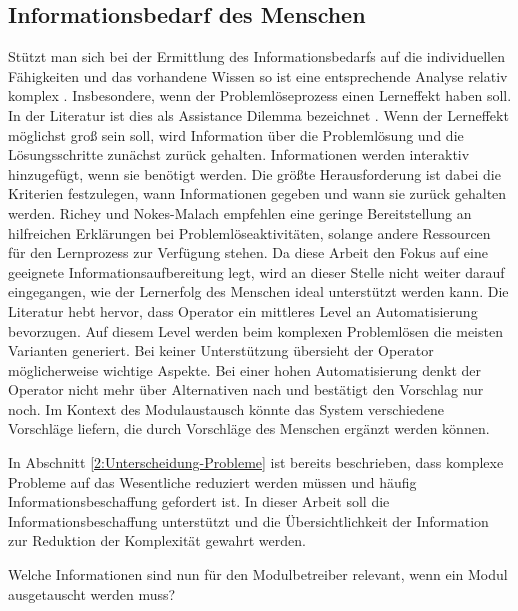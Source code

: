 \subsection{Informationsbedarf des Menschen}
\label{3:Informationsbedarf-Operator}
Stützt man sich bei der Ermittlung des Informationsbedarfs auf die individuellen Fähigkeiten und das vorhandene Wissen so ist eine entsprechende Analyse relativ komplex . Insbesondere, wenn der Problemlöseprozess einen Lerneffekt haben soll. In der Literatur ist dies als Assistance Dilemma bezeichnet \cite{Koedinger2007}. Wenn der Lerneffekt möglichst groß sein soll, wird Information über die Problemlösung und die Lösungsschritte zunächst zurück gehalten. Informationen werden interaktiv hinzugefügt, wenn sie benötigt werden. Die größte Herausforderung ist dabei die Kriterien festzulegen, wann Informationen gegeben und wann sie zurück gehalten werden\cite{Koedinger2007}.  Richey und Nokes-Malach \cite{Richey2013} empfehlen eine geringe Bereitstellung an hilfreichen Erklärungen bei Problemlöseaktivitäten, solange andere Ressourcen für den Lernprozess zur Verfügung stehen. Da diese Arbeit den Fokus auf eine geeignete Informationsaufbereitung legt, wird an dieser Stelle nicht weiter darauf eingegangen, wie der Lernerfolg des Menschen ideal unterstützt werden kann. Die Literatur \cite{Miller2005, Sauer2018} hebt hervor, dass Operator ein mittleres Level an Automatisierung bevorzugen. Auf diesem Level werden beim komplexen Problemlösen die meisten Varianten generiert. Bei keiner Unterstützung übersieht der Operator möglicherweise wichtige Aspekte. Bei einer hohen Automatisierung denkt der Operator nicht mehr über Alternativen nach und bestätigt den Vorschlag nur noch. \cite{Miller2005} Im Kontext des Modulaustausch könnte das System verschiedene Vorschläge liefern, die durch Vorschläge des Menschen ergänzt werden können.

In Abschnitt \ref{2:Unterscheidung-Probleme} ist bereits beschrieben, dass komplexe Probleme auf das Wesentliche reduziert werden müssen und häufig Informationsbeschaffung gefordert ist. In dieser Arbeit soll die Informationsbeschaffung unterstützt und die Übersichtlichkeit der Information zur Reduktion der Komplexität gewahrt werden.

Welche Informationen sind nun für den Modulbetreiber relevant, wenn ein Modul ausgetauscht werden muss?

